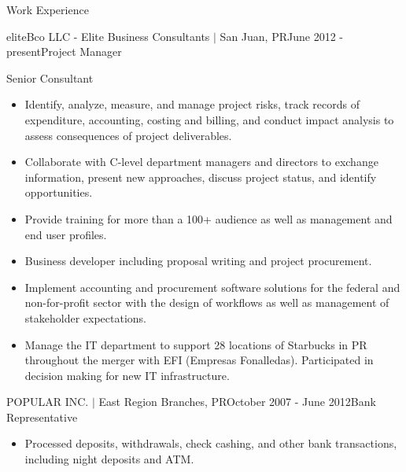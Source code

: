 \documentclass{resume} %
\newcommand{\sectionspace}{\vspace{3mm}}
\begin{document}
\begin{rSection}{Work Experience}
\begin{rSubsection}{eliteBco LLC - Elite
    Business Consultants $\vert$ San Juan, PR}{June 2012 - present}{Project
    Manager}{\space}
\begin{itemize}
\end{itemize}

\end{rSubsection}


\begin{rSubsection}{\space}{\space}{Senior Consultant}{\space}

\item
\begin{itemize}
\item Identify, analyze, measure, and manage project risks, track records of
  expenditure, accounting, costing and billing, and conduct impact analysis to
  assess consequences of project deliverables.

\item Collaborate with C-level department managers and directors to exchange
  information, present new approaches, discuss project status, and identify
  opportunities.

\item Provide training for more than a 100+ audience as well as management and
  end user profiles.

\item Business developer including proposal writing and project procurement.

\item Implement accounting and procurement software solutions for the federal
  and non-for-profit sector with the design of workflows as well as management
  of stakeholder expectations.

\item Manage the IT department to support 28 locations of Starbucks in PR
  throughout the merger with EFI (Empresas Fonalledas). Participated in decision
  making for new IT infrastructure.

\end{itemize}

\end{rSubsection}



\sectionspace
\begin{rSubsection}{POPULAR INC. $\vert$ East Region Branches, PR}{October 2007
    - June 2012}{Bank Representative}{\space}

\item
\begin{itemize}
\item Processed deposits, withdrawals, check cashing, and other bank
  transactions, including night deposits and ATM.


\end{itemize}
\end{rSubsection}
\end{rSection}
\end{document}
